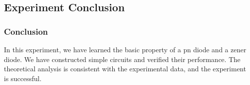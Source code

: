 \subsection{Experiment Conclusion}
    \subsubsection{Conclusion}
    In this experiment, we have learned the basic property of a pn diode and a zener diode. We have constructed simple circuits and verified their performance. The theoretical analysis is consistent with the experimental data, and the experiment is successful.